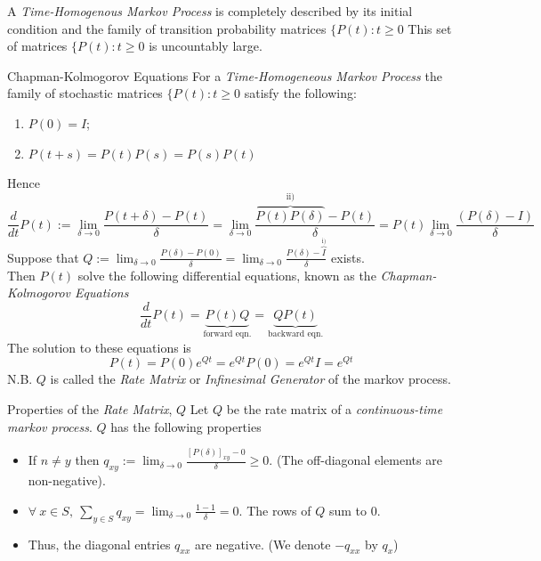 \documentclass[11pt,a4paper]{article}
\begin{document}
\begin{remark}{A \textit{Time-Homogenous Markov Process} is completely described by its initial condition and the family of transition probability matrices $\{P(t):t\geq0$}
  This set of matrices $\{P(t):t\geq0$ is uncountably large.
\end{remark}

\begin{definition}{Chapman-Kolmogorov Equations}
  For a \textit{Time-Homogeneous Markov Process} the family of stochastic matrices $\{P(t):t\geq0$ satisfy the following:
  \begin{enumerate}
    \item $P(0)=I$;
    \item $P(t+s)=P(t)P(s)=P(s)P(t)$
  \end{enumerate}
  Hence
  \[ \frac{d}{dt}P(t):=\lim_{\delta\to0}\frac{P(t+\delta)-P(t)}\delta=\lim_{\delta\to0}\frac{\overbrace{P(t)P(\delta)}^\text{ii)}-P(t)}\delta=P(t)\lim_{\delta\to0}\frac{(P(\delta)-I)}\delta \]
  Suppose that $Q:=\displaystyle\lim_{\delta\to0}\frac{P(\delta)-P(0)}\delta=\lim_{\delta\to0}\frac{P(\delta)-\overbrace{I}^\text{i)}}\delta$ exists.\\
  Then $P(t)$ solve the following differential equations, known as the \textit{Chapman-Kolmogorov Equations}
  \[ \frac{d}{dt}P(t)=\underbrace{P(t)Q}_\text{forward eqn.}=\underbrace{QP(t)}_\text{backward eqn.} \]
  The solution to these equations is
  \[ P(t)=P(0)e^{Qt}=e^{Qt}P(0)=e^{Qt}I=e^{Qt} \]
  N.B. $Q$ is called the \textit{Rate Matrix} or \textit{Infinesimal Generator} of the markov process.
\end{definition}

\begin{proposition}{Properties of the \textit{Rate Matrix}, $Q$}
  Let $Q$ be the rate matrix of a \textit{continuous-time markov process}. $Q$ has the following properties
  \begin{itemize}
    \item If $n\neq y$ then $\displaystyle q_{xy}:=\lim_{\delta\to0}\frac{[P(\delta)]_{xy}-0}\delta\geq0$. (The off-diagonal elements are non-negative).
    \item $\displaystyle\forall\ x\in S,\ \sum_{y\in S}q_{xy}=\lim_{\delta\to0}\frac{1-1}\delta=0$. The rows of $Q$ sum to 0.
    \item Thus, the diagonal entries $q_{xx}$ are negative. (We denote $-q_{xx}$ by $q_x$)
  \end{itemize}
\end{proposition}
\end{document}
